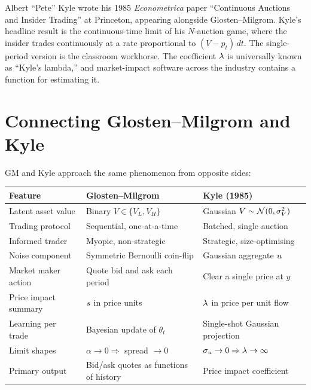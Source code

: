 \begin{historybox}
Albert ``Pete'' Kyle wrote his 1985 \emph{Econometrica} paper
``Continuous Auctions and Insider Trading'' \citeKyle{} at
Princeton, appearing alongside Glosten--Milgrom. Kyle's headline
result is the continuous-time limit of his $N$-auction game,
where the insider trades continuously at a rate proportional to
$(V - p_t)\,dt$. The single-period version is the classroom
workhorse. The coefficient $\lambda$ is universally known as
``Kyle's lambda,'' and market-impact software across the
industry contains a function for estimating it.
\end{historybox}

\section{Connecting Glosten--Milgrom and Kyle}
\label{sec:gm_vs_kyle}

GM and Kyle approach the same phenomenon from opposite sides:

\begin{center}
\begin{tabular}{>{\raggedright\arraybackslash}p{3.3cm}
                >{\raggedright\arraybackslash}p{5.4cm}
                >{\raggedright\arraybackslash}p{5.4cm}}
\toprule
Feature & Glosten--Milgrom & Kyle (1985) \\
\midrule
Latent asset value           & Binary $V \in \{V_L, V_H\}$ & Gaussian $V \sim \mathcal{N}(0, \sigma_V^2)$ \\
Trading protocol             & Sequential, one-at-a-time & Batched, single auction \\
Informed trader              & Myopic, non-strategic & Strategic, size-optimising \\
Noise component              & Symmetric Bernoulli coin-flip & Gaussian aggregate $u$ \\
Market maker action          & Quote bid and ask each period & Clear a single price at $y$ \\
Price impact summary         & $s$ in price units & $\lambda$ in price per unit flow \\
Learning per trade           & Bayesian update of $\theta_t$ & Single-shot Gaussian projection \\
Limit shapes                 & $\alpha \to 0 \Rightarrow$ spread $\to 0$ & $\sigma_u \to 0 \Rightarrow \lambda \to \infty$ \\
Primary output               & Bid/ask quotes as functions of history & Price impact coefficient \\
\bottomrule
\end{tabular}
\end{center}

